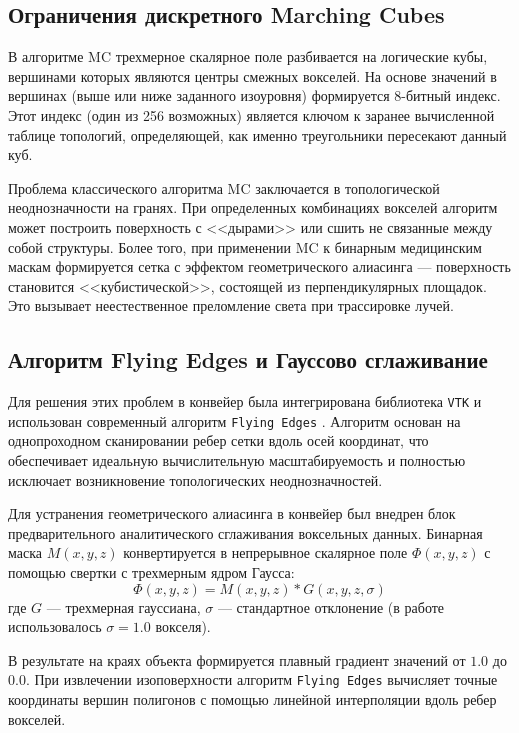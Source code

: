 \documentclass[a4paper,14pt]{article}
\begin{document}
\subsection{Ограничения дискретного Marching Cubes}
В алгоритме MC трехмерное скалярное поле разбивается на логические кубы, вершинами которых являются центры смежных вокселей. На основе значений в вершинах (выше или ниже заданного изоуровня) формируется 8-битный индекс. Этот индекс (один из 256 возможных) является ключом к заранее вычисленной таблице топологий, определяющей, как именно треугольники пересекают данный куб.

Проблема классического алгоритма MC заключается в топологической неоднозначности на гранях. При определенных комбинациях вокселей алгоритм может построить поверхность с <<дырами>> или сшить не связанные между собой структуры. Более того, при применении MC к бинарным медицинским маскам формируется сетка с эффектом геометрического алиасинга — поверхность становится <<кубистической>>, состоящей из перпендикулярных площадок. Это вызывает неестественное преломление света при трассировке лучей.

\subsection{Алгоритм Flying Edges и Гауссово сглаживание}
Для решения этих проблем в конвейер была интегрирована библиотека \texttt{VTK} и использован современный алгоритм \texttt{Flying Edges} \cite{schroeder2015}. Алгоритм основан на однопроходном сканировании ребер сетки вдоль осей координат, что обеспечивает идеальную вычислительную масштабируемость и полностью исключает возникновение топологических неоднозначностей.

Для устранения геометрического алиасинга в конвейер был внедрен блок предварительного аналитического сглаживания воксельных данных. Бинарная маска $M(x,y,z)$ конвертируется в непрерывное скалярное поле $\Phi(x,y,z)$ с помощью свертки с трехмерным ядром Гаусса:
\begin{equation}
    \Phi(x,y,z) = M(x,y,z) * G(x,y,z, \sigma)
\end{equation}
где $G$ — трехмерная гауссиана, $\sigma$ — стандартное отклонение (в работе использовалось $\sigma=1.0$ вокселя).

В результате на краях объекта формируется плавный градиент значений от $1.0$ до $0.0$. При извлечении изоповерхности алгоритм \texttt{Flying Edges} вычисляет точные координаты вершин полигонов с помощью линейной интерполяции вдоль ребер вокселей.
\end{document}
